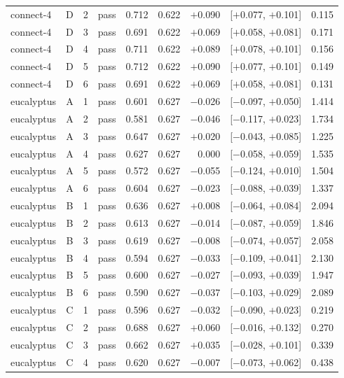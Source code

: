{\begin{longtable}{lccl rrrcr}
connect-4 & D & 2 & pass & 0.712 & 0.622 & $+$0.090 & [$+$0.077, $+$0.101] & 0.115 \\
connect-4 & D & 3 & pass & 0.691 & 0.622 & $+$0.069 & [$+$0.058, $+$0.081] & 0.171 \\
connect-4 & D & 4 & pass & 0.711 & 0.622 & $+$0.089 & [$+$0.078, $+$0.101] & 0.156 \\
connect-4 & D & 5 & pass & 0.712 & 0.622 & $+$0.090 & [$+$0.077, $+$0.101] & 0.149 \\
connect-4 & D & 6 & pass & 0.691 & 0.622 & $+$0.069 & [$+$0.058, $+$0.081] & 0.131 \\
\midrule
eucalyptus & A & 1 & pass & 0.601 & 0.627 & $-$0.026 & [$-$0.097, $+$0.050] & 1.414 \\
eucalyptus & A & 2 & pass & 0.581 & 0.627 & $-$0.046 & [$-$0.117, $+$0.023] & 1.734 \\
eucalyptus & A & 3 & pass & 0.647 & 0.627 & $+$0.020 & [$-$0.043, $+$0.085] & 1.225 \\
eucalyptus & A & 4 & pass & 0.627 & 0.627 & 0.000 & [$-$0.058, $+$0.059] & 1.535 \\
eucalyptus & A & 5 & pass & 0.572 & 0.627 & $-$0.055 & [$-$0.124, $+$0.010] & 1.504 \\
eucalyptus & A & 6 & pass & 0.604 & 0.627 & $-$0.023 & [$-$0.088, $+$0.039] & 1.337 \\
\addlinespace[2pt]
eucalyptus & B & 1 & pass & 0.636 & 0.627 & $+$0.008 & [$-$0.064, $+$0.084] & 2.094 \\
eucalyptus & B & 2 & pass & 0.613 & 0.627 & $-$0.014 & [$-$0.087, $+$0.059] & 1.846 \\
eucalyptus & B & 3 & pass & 0.619 & 0.627 & $-$0.008 & [$-$0.074, $+$0.057] & 2.058 \\
eucalyptus & B & 4 & pass & 0.594 & 0.627 & $-$0.033 & [$-$0.109, $+$0.041] & 2.130 \\
eucalyptus & B & 5 & pass & 0.600 & 0.627 & $-$0.027 & [$-$0.093, $+$0.039] & 1.947 \\
eucalyptus & B & 6 & pass & 0.590 & 0.627 & $-$0.037 & [$-$0.103, $+$0.029] & 2.089 \\
\addlinespace[2pt]
eucalyptus & C & 1 & pass & 0.596 & 0.627 & $-$0.032 & [$-$0.090, $+$0.023] & 0.219 \\
eucalyptus & C & 2 & pass & 0.688 & 0.627 & $+$0.060 & [$-$0.016, $+$0.132] & 0.270 \\
eucalyptus & C & 3 & pass & 0.662 & 0.627 & $+$0.035 & [$-$0.028, $+$0.101] & 0.339 \\
eucalyptus & C & 4 & pass & 0.620 & 0.627 & $-$0.007 & [$-$0.073, $+$0.062] & 0.438 \\

\end{longtable}}
